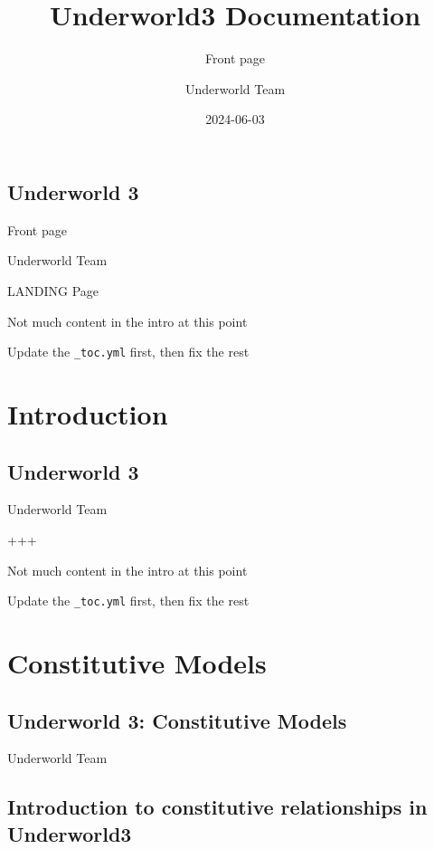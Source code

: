 \documentclass[
  letterpaper,
  DIV=11,
  numbers=noendperiod]{scrreprt}
\title{Underworld3 Documentation}
\subtitle{Front page}
\author{Underworld Team}
\date{2024-06-03}
\renewcommand*\contentsname{Table of contents}
\newcommand\contentsname{Table of contents}
\begin{document}
\maketitle

\renewcommand*\contentsname{Table of contents}
{
\hypersetup{linkcolor=}
\setcounter{tocdepth}{2}
\tableofcontents
}
\chapter{Underworld 3}\label{underworld-3}

Front page

Underworld Team

\hfill\break

LANDING Page

Not much content in the intro at this point

Update the \texttt{\_toc.yml} first, then fix the rest

\part{Introduction}

\chapter{Underworld 3}\label{underworld-3-1}

Underworld Team

\hfill\break

+++

Not much content in the intro at this point

Update the \texttt{\_toc.yml} first, then fix the rest

\part{Constitutive Models}

\chapter{Underworld 3: Constitutive
Models}\label{underworld-3-constitutive-models}

Underworld Team

\hfill\break

\chapter{Introduction to constitutive relationships in
Underworld3}\label{introduction-to-constitutive-relationships-in-underworld3}
\end{document}
